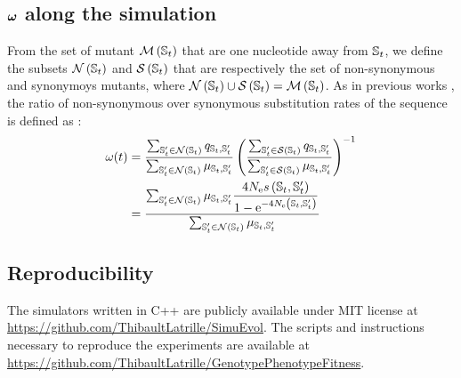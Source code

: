 \documentclass{article}
\begin{document}
\subsection{$\bm{\omega}$ along the simulation}
From the set of mutant $\mathcal{M}\left(\mathbb{S}_{t}\right)$ that are one nucleotide away from $\mathbb{S}_{t}$, we define the subsets $\mathcal{N}\left(\mathbb{S}_{t}\right)$ and $\mathcal{S}\left(\mathbb{S}_{t}\right)$ that are respectively the set of non-synonymous and synonymoys mutants, where  $\mathcal{N}\left(\mathbb{S}_{t}\right) \cup \mathcal{S}\left(\mathbb{S}_{t}\right) = \mathcal{M}\left(\mathbb{S}_{t}\right)$.
As in previous works \cite{Spielman2015a, DosReis2015, Jones2016}, the ratio of non-synonymous over synonymous substitution rates of the sequence is defined as :
\begin{align}
\omega(t) &= \dfrac{\sum_{\mathbb{S}_{t}' \in \mathcal{N}\left(\mathbb{S}_{t}\right)} q_{\mathbb{S}_{t}, \mathbb{S}_{t}'}}{\sum_{\mathbb{S}_{t}' \in \mathcal{N}\left(\mathbb{S}_{t}\right)} \mu_{\mathbb{S}_{t}, \mathbb{S}_{t}'}} \left( \dfrac{\sum_{\mathbb{S}_{t}' \in \mathcal{S}\left(\mathbb{S}_{t}\right)} q_{\mathbb{S}_{t}, \mathbb{S}_{t}'}}{\sum_{\mathbb{S}_{t}' \in \mathcal{S}\left(\mathbb{S}_{t}\right)} \mu_{\mathbb{S}_{t}, \mathbb{S}_{t}'}} \right)^{-1}\\
 &= \dfrac{\sum_{\mathbb{S}_{t}' \in \mathcal{N}\left(\mathbb{S}_{t}\right)} \mu_{\mathbb{S}_{t}, \mathbb{S}_{t}'} \dfrac{4 N_{\mathrm{e}} s \left( \mathbb{S}_{t},\mathbb{S}_{t}'\right)}{{1 - \mathrm{e}^{-4 N_{\mathrm{e}} \left( \mathbb{S}_{t},\mathbb{S}_{t}'\right)} }}}{\sum_{\mathbb{S}_{t}' \in \mathcal{N}\left(\mathbb{S}_{t}\right)} \mu_{\mathbb{S}_{t}, \mathbb{S}_{t}'}} 
\end{align}
\subsection{Reproducibility}
The simulators written in C++ are publicly available under MIT license at \url{https://github.com/ThibaultLatrille/SimuEvol}.
The scripts and instructions necessary to reproduce the experiments are available at \url{https://github.com/ThibaultLatrille/GenotypePhenotypeFitness}.



\end{document}
